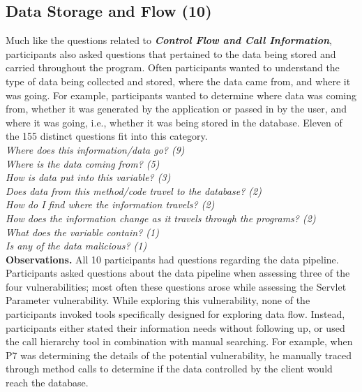 \documentclass[conference]{IEEEtran}
\begin{document}



\noindent\subsection{\textbf{Data Storage and Flow (10)}}\label{dsf}
Much like the questions related to \emph{\textbf{Control Flow and Call Information}}, participants also asked questions that pertained to the data being stored and carried throughout the program. 
Often participants wanted to understand the type of data being collected and stored, where the data came from, and where it was going. 
For example, participants wanted to determine where data was coming from, whether it was generated by the application or passed in by the user, and where it was going, i.e., whether it was being stored in the database.
Eleven of the 155 distinct questions fit into this category.
\\

\noindent\emph{Where does this information/data go? (9)} \\
\emph{Where is the data coming from? (5)} \\
\emph{How is data put into this variable? (3)} \\
\emph{Does data from this method/code travel to the database? (2)} \\
\emph{How do I find where the information travels? (2)} \\
\emph{How does the information change as it travels through the programs? (2)} \\
\emph{What does the variable contain? (1)} \\
\emph{Is any of the data malicious? (1)} \\


\noindent\textbf{Observations.}
All 10 participants had questions regarding the data pipeline.
Participants asked questions about the data pipeline when assessing three of the four vulnerabilities; most often these questions arose while assessing the Servlet Parameter vulnerability. 
While exploring this vulnerability, none of the participants invoked tools specifically designed for exploring data flow. 
Instead, participants either stated their information needs without following up, or used the call hierarchy tool in combination with manual searching.
For example, when P7 was determining the details of the potential vulnerability, he manually traced through method calls to determine if the data controlled by the client would reach the database.
\end{document}
